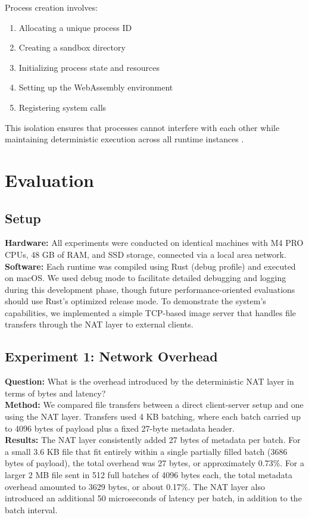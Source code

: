 \documentclass[10pt]{IEEEtran}
\begin{document}
Process creation involves:
\begin{enumerate}
    \item Allocating a unique process ID
    \item Creating a sandbox directory
    \item Initializing process state and resources
    \item Setting up the WebAssembly environment
    \item Registering system calls
\end{enumerate}

This isolation ensures that processes cannot interfere with each other while maintaining deterministic execution across all runtime instances \cite{replicode2025}.

\section{Evaluation}

\subsection{Setup}
\textbf{Hardware:} All experiments were conducted on identical machines with M4 PRO CPUs, 48 GB of RAM, and SSD storage, connected via a local area network. \\
\textbf{Software:} Each runtime was compiled using Rust (debug profile) and executed on macOS. We used debug mode to facilitate detailed debugging and logging during this development phase, though future performance-oriented evaluations should use Rust's optimized release mode. To demonstrate the system's capabilities, we implemented a simple TCP-based image server that handles file transfers through the NAT layer to external clients.

\subsection{Experiment 1: Network Overhead}
\textbf{Question:} What is the overhead introduced by the deterministic NAT layer in terms of bytes and latency? \\

\textbf{Method:} We compared file transfers between a direct client-server setup and one using the NAT layer. Transfers used 4 KB batching, where each batch carried up to 4096 bytes of payload plus a fixed 27-byte metadata header. \\

\textbf{Results:} The NAT layer consistently added 27 bytes of metadata per batch. For a small 3.6 KB file that fit entirely within a single partially filled batch (3686 bytes of payload), the total overhead was 27 bytes, or approximately 0.73\%. For a larger 2 MB file sent in 512 full batches of 4096 bytes each, the total metadata overhead amounted to 3629 bytes, or about 0.17\%. The NAT layer also introduced an additional 50 microseconds of latency per batch, in addition to the batch interval. \\
\end{document}
